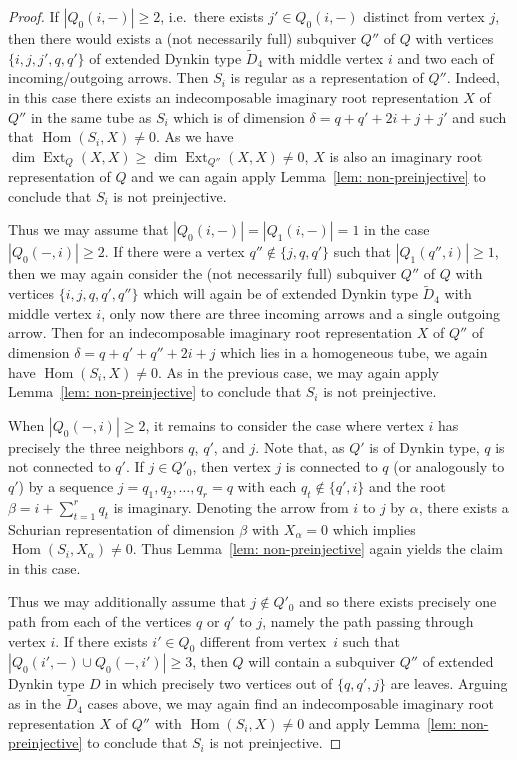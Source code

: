 \documentclass{amsart}
\numberwithin{equation}{section}
\newcommand{\Ext}{\operatorname{Ext}}
\newcommand{\Hom}{\operatorname{Hom}}
\begin{document}
\begin{proof}
  If $|Q_0(i,-)|\ge2$, i.e.~there exists $j'\in Q_0(i,-)$ distinct from vertex $j$, then there would exists a (not necessarily full) subquiver $Q''$ of $Q$ with vertices $\{i,j,j',q,q'\}$ of extended Dynkin type $\tilde D_4$ with middle vertex $i$ and two each of incoming/outgoing arrows.
  Then $S_i$ is regular as a representation of $Q''$.
  Indeed, in this case there exists an indecomposable imaginary root representation $X$ of $Q''$ in the same tube as $S_i$ which is of dimension $\delta=q+q'+2i+j+j'$ and such that $\Hom(S_i,X)\neq 0$.
  As we have $\dim\Ext_Q(X,X)\geq\dim\Ext_{Q''}(X,X)\neq 0$, $X$ is also an imaginary root representation of $Q$ and we can again apply Lemma~\ref{lem: non-preinjective} to conclude that $S_i$ is not preinjective.

  Thus we may assume that $|Q_0(i,-)|=|Q_1(i,-)|=1$ in the case $|Q_0(-,i)|\ge2$.
  If there were a vertex $q''\notin \{j,q,q'\}$ such that $|Q_1(q'',i)|\geq 1$, then we may again consider the (not necessarily full) subquiver $Q''$ of $Q$ with vertices $\{i,j,q,q',q''\}$ which will again be of extended Dynkin type $\tilde D_4$ with middle vertex $i$, only now there are three incoming arrows and a single outgoing arrow.
  Then for an indecomposable imaginary root representation $X$ of $Q''$ of dimension $\delta=q+q'+q''+2i+j$ which lies in a homogeneous tube, we again have $\Hom(S_i,X)\neq 0$.
  As in the previous case, we may again apply Lemma~\ref{lem: non-preinjective} to conclude that $S_i$ is not preinjective.

  When $|Q_0(-,i)|\ge2$, it remains to consider the case where vertex $i$ has precisely the three neighbors $q$, $q'$, and $j$.
  Note that, as $Q'$ is of Dynkin type, $q$ is not connected to $q'$.
  If $j\in Q'_0$, then vertex $j$ is connected to $q$ (or analogously to $q'$) by a sequence $j=q_1,q_2,\ldots,q_r=q$ with each $q_t\notin\{q',i\}$ and the root $\beta=i+\sum_{t=1}^r q_t$ is imaginary.
  Denoting the arrow from $i$ to $j$ by $\alpha$, there exists a Schurian representation of dimension $\beta$ with $X_\alpha=0$ which implies $\Hom(S_i,X_\alpha)\neq 0$. 
  Thus Lemma~\ref{lem: non-preinjective} again yields the claim in this case.

  Thus we may additionally assume that $j\notin Q'_0$ and so there exists precisely one path from each of the vertices $q$ or $q'$ to $j$, namely the path passing through vertex $i$.
  If there exists $i'\in Q_0$ different from vertex~$i$ such that $|Q_0(i',-)\cup Q_0(-,i')|\geq 3$, then $Q$ will contain a subquiver $Q''$ of extended Dynkin type $D$ in which precisely two vertices out of $\{q,q',j\}$ are leaves.
  Arguing as in the $\tilde D_4$ cases above, we may again find an indecomposable imaginary root representation $X$ of $Q''$ with $\Hom(S_i,X)\neq 0$ and apply Lemma~\ref{lem: non-preinjective} to conclude that $S_i$ is not preinjective.


\end{proof}
\end{document}
